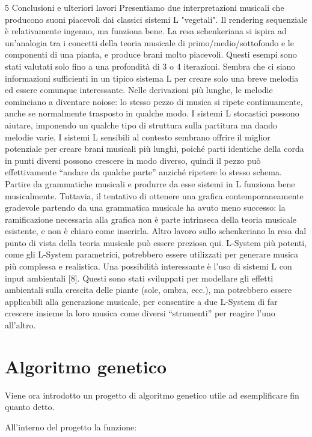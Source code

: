 \documentclass[a4paper,12pt]{report}
\begin{document}
5 Conclusioni e ulteriori lavori
Presentiamo due interpretazioni musicali che producono suoni piacevoli dai classici sistemi L "vegetali". 
Il rendering sequenziale è relativamente ingenuo, ma funziona bene. 
La resa schenkeriana si ispira ad un'analogia tra i concetti della teoria musicale di primo/medio/sottofondo e le componenti di una pianta, e produce brani molto piacevoli.
Questi esempi sono stati valutati solo fino a una profondità di 3 o 4 iterazioni. 
Sembra che ci siano informazioni sufficienti in un tipico sistema L per creare solo una breve melodia ed essere comunque interessante. 
Nelle derivazioni più lunghe, le melodie cominciano a diventare noiose: lo stesso pezzo di musica si ripete continuamente, anche se normalmente trasposto in qualche modo. 
I sistemi L stocastici possono aiutare, imponendo un qualche tipo di struttura sulla partitura ma dando melodie varie. 
I sistemi L sensibili al contesto sembrano offrire il miglior potenziale per creare brani musicali più lunghi, poiché parti identiche della corda in punti diversi possono crescere in modo diverso, quindi il pezzo può effettivamente “andare da qualche parte” anziché ripetere lo stesso schema.
Partire da grammatiche musicali e produrre da esse sistemi in L funziona bene musicalmente. 
Tuttavia, il tentativo di ottenere una grafica contemporaneamente gradevole partendo da una grammatica musicale ha avuto meno successo: la ramificazione necessaria alla grafica non è parte intrinseca della teoria musicale esistente, e non è chiaro come inserirla. Altro lavoro sullo schenkeriano la resa dal punto di vista della teoria musicale può essere preziosa qui.
L-System più potenti, come gli L-System parametrici, potrebbero essere utilizzati per generare musica più complessa e realistica. Una possibilità interessante è l'uso di sistemi L con input ambientali [8]. 
Questi sono stati sviluppati per modellare gli effetti ambientali sulla crescita delle piante (sole, ombra, ecc.), ma potrebbero essere applicabili alla generazione musicale, per consentire a due L-System di far crescere insieme la loro musica come diversi “strumenti” per reagire l’uno all’altro.

\chapter{Algoritmo genetico}

Viene ora introdotto un progetto di algoritmo genetico utile ad esemplificare fin quanto detto.

All'interno del progetto la funzione:
\end{document}
